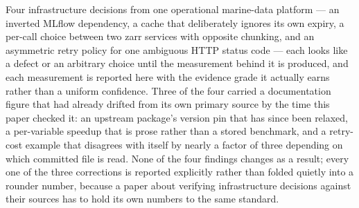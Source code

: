 Four infrastructure decisions from one operational marine-data platform ---
an inverted MLflow dependency, a cache that deliberately ignores its own
expiry, a per-call choice between two zarr services with opposite chunking,
and an asymmetric retry policy for one ambiguous HTTP status code --- each
looks like a defect or an arbitrary choice until the measurement behind it
is produced, and each measurement is reported here with the evidence grade
it actually earns rather than a uniform confidence. Three of the four
carried a documentation figure that had already drifted from its own primary
source by the time this paper checked it: an upstream package's version pin
that has since been relaxed, a per-variable speedup that is prose rather
than a stored benchmark, and a retry-cost example that disagrees with itself
by nearly a factor of three depending on which committed file is read. None
of the four findings changes as a result; every one of the three corrections
is reported explicitly rather than folded quietly into a rounder number,
because a paper about verifying infrastructure decisions against their
sources has to hold its own numbers to the same standard.
